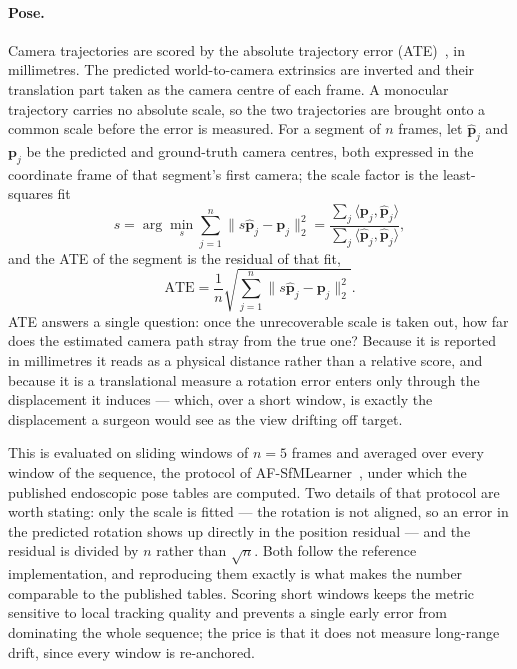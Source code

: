 \documentclass[11pt]{article}
\begin{document}
\paragraph{Pose.}
Camera trajectories are scored by the absolute trajectory error (ATE)~\cite{sturm2012benchmark},
in millimetres. The predicted world-to-camera extrinsics are inverted and their translation part
taken as the camera centre of each frame. A monocular trajectory carries no absolute scale, so
the two trajectories are brought onto a common scale before the error is measured. For a segment
of $n$ frames, let $\hat{\mathbf{p}}_j$ and $\mathbf{p}_j$ be the predicted and ground-truth
camera centres, both expressed in the coordinate frame of that segment's first camera; the scale
factor is the least-squares fit
\begin{equation}
  s = \arg\min_{s} \sum_{j=1}^{n} \big\| s\hat{\mathbf{p}}_j - \mathbf{p}_j \big\|_{2}^{2}
    = \frac{\sum_{j} \langle \mathbf{p}_j, \hat{\mathbf{p}}_j \rangle}
           {\sum_{j} \langle \hat{\mathbf{p}}_j, \hat{\mathbf{p}}_j \rangle} ,
\end{equation}
and the ATE of the segment is the residual of that fit,
\begin{equation}
  \text{ATE} = \frac{1}{n} \sqrt{ \sum_{j=1}^{n}
    \big\| s\hat{\mathbf{p}}_j - \mathbf{p}_j \big\|_{2}^{2} } .
\end{equation}
ATE answers a single question: once the unrecoverable scale is taken out, how far does the
estimated camera path stray from the true one? Because it is reported in millimetres it reads as
a physical distance rather than a relative score, and because it is a translational measure a
rotation error enters only through the displacement it induces --- which, over a short window, is
exactly the displacement a surgeon would see as the view drifting off target.

This is evaluated on sliding windows of $n = 5$ frames and averaged over every window of the
sequence, the protocol of AF-SfMLearner~\cite{shao2022afsfmlearner}, under which the published
endoscopic pose tables are computed. Two details of that protocol are worth stating: only the scale is fitted --- the
rotation is not aligned, so an error in the predicted rotation shows up directly in the position
residual --- and the residual is divided by $n$ rather than $\sqrt{n}$. Both follow the reference
implementation, and reproducing them exactly is what makes the number comparable to the published
tables. Scoring short windows keeps the metric sensitive to local tracking quality and prevents a
single early error from dominating the whole sequence; the price is that it does not measure
long-range drift, since every window is re-anchored.
\end{document}

